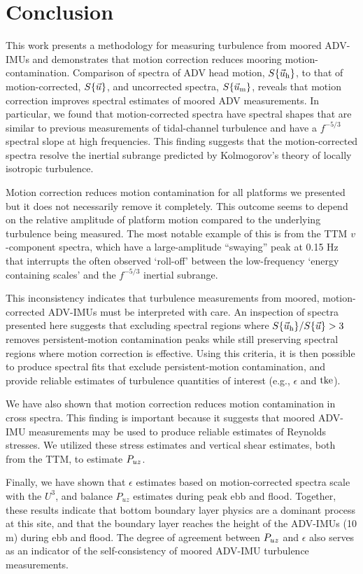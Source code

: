 
\section{Conclusion}
\label{sec:conclusion}
 
This work presents a methodology for measuring turbulence from moored ADV-IMUs and demonstrates that motion correction reduces mooring motion-contamination. Comparison of spectra of ADV head motion, $S\{\vec{u}_\mathrm{h}\}$, to that of motion-corrected, $S\{\vec{u}\}$, and uncorrected spectra, $S\{\vec{u}_\mathrm{m}\}$, reveals that motion correction improves spectral estimates of moored ADV measurements. In particular, we found that motion-corrected spectra have spectral shapes that are similar to previous measurements of tidal-channel turbulence and have a $f^{-5/3}$ spectral slope at high frequencies. This finding suggests that the motion-corrected spectra resolve the inertial subrange predicted by Kolmogorov's theory of locally isotropic turbulence.

Motion correction reduces motion contamination for all platforms we presented but it does not necessarily remove it completely. This outcome seems to depend on the relative amplitude of platform motion compared to the underlying turbulence being measured. The most notable example of this is from the TTM $v$-component spectra, which have a large-amplitude ``swaying'' peak at 0.15 Hz that interrupts the often observed `roll-off' between the low-frequency `energy containing scales' and the $f^{-5/3}$ inertial subrange.

This inconsistency indicates that turbulence measurements from moored, motion-corrected ADV-IMUs must be interpreted with care. An inspection of spectra presented here suggests that excluding spectral regions where $S\{\vec{u}_\mathrm{h}\} / S\{\vec{u}\} > 3$ removes persistent-motion contamination peaks while still preserving spectral regions where motion correction is effective. Using this criteria, it is then possible to produce spectral fits that exclude persistent-motion contamination, and provide reliable estimates of turbulence quantities of interest (e.g., $\epsilon$ and $\mathrm{tke}$).

We have also shown that motion correction reduces motion contamination in cross spectra. This finding is important because it suggests that moored ADV-IMU measurements may be used to produce reliable estimates of Reynolds stresses. We utilized these stress estimates and vertical shear estimates, both from the TTM, to estimate $P_{uz}$. 

Finally, we have shown that $\epsilon$ estimates based on motion-corrected spectra scale with the $U^3$, and balance $P_{uz}$ estimates during peak ebb and flood. Together, these results indicate that bottom boundary layer physics are a dominant process at this site, and that the boundary layer reaches the height of the ADV-IMUs (10 m) during ebb and flood. The degree of agreement between $P_{uz}$ and $\epsilon$ also serves as an indicator of the self-consistency of moored ADV-IMU turbulence measurements. 

